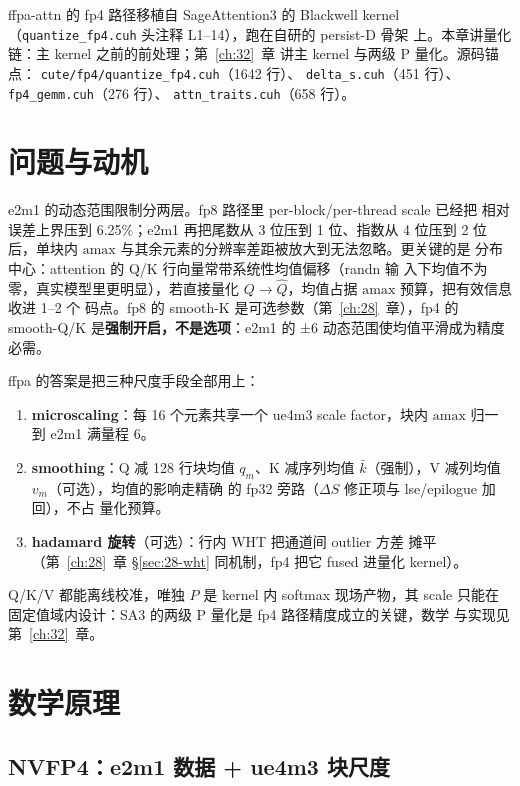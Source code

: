ffpa-attn 的 fp4 路径移植自 SageAttention3 的 Blackwell kernel
（\texttt{quantize\_fp4.cuh} 头注释 L1--14），跑在自研的 persist-D 骨架
上。本章讲量化链：主 kernel 之前的前处理；第~\ref{ch:32}~章
讲主 kernel 与两级 P 量化。源码锚点：
\texttt{cute/fp4/quantize\_fp4.cuh}（1642 行）、
\texttt{delta\_s.cuh}（451 行）、\texttt{fp4\_gemm.cuh}（276 行）、
\texttt{attn\_traits.cuh}（658 行）。

\section{问题与动机}

e2m1 的动态范围限制分两层。fp8 路径里 per-block/per-thread scale 已经把
相对误差上界压到 6.25\%；e2m1 再把尾数从 3 位压到 1 位、指数从 4 位压到 2 位后，单块内
$\mathrm{amax}$ 与其余元素的分辨率差距被放大到无法忽略。更关键的是
分布中心：attention 的 Q/K 行向量常带系统性均值偏移（randn 输
入下均值不为零，真实模型里更明显），若直接量化
$Q\to\hat Q$，均值占据 $\mathrm{amax}$ 预算，把有效信息收进 1--2 个
码点。fp8 的 smooth-K 是可选参数（第~\ref{ch:28}~章），fp4 的
smooth-Q/K 是\textbf{强制开启，不是选项}：e2m1 的 ±6
动态范围使均值平滑成为精度必需。

ffpa 的答案是把三种尺度手段全部用上：
\begin{enumerate}[itemsep=0pt,topsep=2pt]
  \item \textbf{microscaling}：每 16 个元素共享一个 ue4m3 scale
        factor，块内 $\mathrm{amax}$ 归一到 e2m1 满量程 6。
  \item \textbf{smoothing}：Q 减 128 行块均值 $q_m$、K 减序列均值
        $\bar k$（强制），V 减列均值 $v_m$（可选），均值的影响走精确
        的 fp32 旁路（$\Delta S$ 修正项与 lse/epilogue 加回），不占
        量化预算。
  \item \textbf{hadamard 旋转}（可选）：行内 WHT 把通道间 outlier 方差
        摊平（第~\ref{ch:28}~章 \S\ref{sec:28-wht} 同机制，fp4 把它 fused 进量化
        kernel）。
\end{enumerate}

Q/K/V 都能离线校准，唯独 $P$ 是 kernel 内 softmax 现场产物，其 scale
只能在固定值域内设计：SA3 的两级 P 量化是 fp4 路径精度成立的关键，数学
与实现见第~\ref{ch:32}~章。

\section{数学原理}

\subsection{NVFP4：e2m1 数据 + ue4m3 块尺度}

